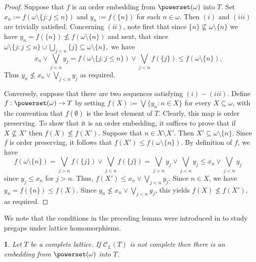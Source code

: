 \documentclass[12pt]{amsart}
\newtheorem{lemma}[definition]{\noindent {\bf Lemma}}
\begin{document}
\begin{proof} 
Suppose that $f$ is an order embedding from $\powerset(\omega)$ into
$T$.  Set $x_n:=f(\omega\setminus \{j: j\leq n\})$ and $y_n:=f(\{n\})$
for each $n\in \omega$.  Then $(i)$ and $(iii)$ are trivially
satisfied. Concerning $(ii)$, note first that since $\{n\}\not
\subseteq \omega \setminus \{n\}$ we have $y_n=f(\{n\})\not \leq
f(\omega\setminus \{n\})$ and next, that since $\omega\setminus \{j:
j\leq n\}\cup \bigcup_{j<n} \{j\} \subseteq \omega \setminus \{n\} , $
we have $$ x_n\vee \bigvee_{j<n}y_j =f(\omega\setminus \{j: j\leq
n\})\vee\bigvee_{j<n}f(\{j \}) \leq f(\omega\setminus \{n\}).$$ Thus
$y_n\not\leq x_n\vee \bigvee_{j<n}y_j$ as required.

Conversely, suppose that there are two sequences satisfying $(i) -
(iii)$. Define $f:\powerset(\omega)\rightarrow T$ by setting $f(X):=
\bigvee\{y_n: n\in X\}$ for every $X\subseteq \omega $, with the
convention that $f(\emptyset)$ is the least element of $T$. Clearly,
this map is order preserving. To show that it is an order embedding,
it suffices to prove that if $X\not \subseteq X'$ then $f(X)\not \leq
f(X')$. Suppose that $n\in X\setminus X'$. Then $X'\subseteq \omega
\setminus \{n\}$. Since $f$ is order preserving, it follows that
$f(X') \leq f(\omega \setminus \{n\})$. By definition of $f$, we
have 
\[ f(\omega\setminus \{n\})= \bigvee_{j> n}f(\{j\} )\vee
\bigvee_{j<n} f(\{j\})= \bigvee_{j>n}y_{j}\vee \bigvee_{j<n} y_j\leq
x_n\vee \bigvee_{j<n}y_j\]
since $y_j\leq x_n$ for $j>n$.  Thus,
$f(X')\leq x_n\vee \bigvee_{j<n}y_j$. Since $n\in X$, we have $y_n=
f(\{n\}) \leq f(X)$. Since $y_n\not \leq x_n\vee \bigvee_{j<n}y_j$,
this yields $f(X)\not \leq f(X')$, as required.  \end{proof}

\medskip

We note that the conditions in the preceding lemma were introduced in
\cite{P-R} to study pregaps under lattice homomorphisms.

\begin{lemma}\label{lem:main} 
Let $T$ be a complete lattice. If $\mathcal{C}_{ L}(T)$ is not complete then there is an embedding from $\powerset(\omega)$ into $T$. 
\end{lemma}
\end{document}
